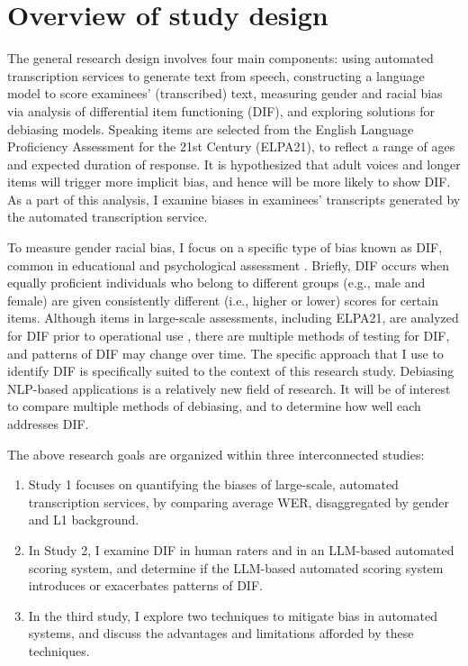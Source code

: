 \documentclass [PhD] {uclathes}
\begin{document}
\section{Overview of study design}

The general research design involves four main components: using automated transcription services to generate text from speech, constructing a language model to score examinees’ (transcribed) text, measuring gender and racial bias via analysis of differential item functioning (DIF), and exploring solutions for debiasing models. Speaking items are selected from the English Language Proficiency Assessment for the 21st Century (ELPA21), to reflect a range of ages and expected duration of response. It is hypothesized that adult voices and longer items will trigger more implicit bias, and hence will be more likely to show DIF. As a part of this analysis, I examine biases in examinees' transcripts generated by the automated transcription service. 

To measure gender racial bias, I focus on a specific type of bias known as DIF, common in educational and psychological assessment \citep{aera2014}. Briefly, DIF occurs when equally proficient individuals who belong to different groups (e.g., male and female) are given consistently different (i.e., higher or lower) scores for certain items. Although items in large-scale assessments, including ELPA21, are analyzed for DIF prior to operational use \citep{anderson2015elpa21}, there are multiple methods of testing for DIF, and patterns of DIF may change over time. The specific approach that I use to identify DIF is specifically suited to the context of this research study. Debiasing NLP-based applications is a relatively new field of research. It will be of interest to compare multiple methods of debiasing, and to determine how well each addresses DIF.

The above research goals are organized within three interconnected studies: 

\begin{enumerate}
    \item Study 1 focuses on quantifying the biases of large-scale, automated transcription services, by comparing average WER, disaggregated by gender and L1 background.
    \item In Study 2, I examine DIF in human raters and in an LLM-based automated scoring system, and determine if the LLM-based automated scoring system introduces or exacerbates patterns of DIF. 
    \item In the third study, I explore two techniques to mitigate bias in automated systems, and discuss the advantages and limitations afforded by these techniques.
\end{enumerate}
\end{document}
